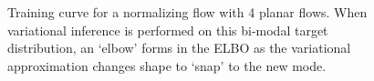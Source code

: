 \lipsum[4]


\setlength\figureheight{5in}
\setlength\figurewidth{5in}

%      

%          
%          
%         

\begin{figure}
    \begin{adjustwidth}{-2cm}{-2cm}
    \centering
     
    \caption{Training curve for a normalizing flow with 4 planar flows. When variational inference is performed on this bi-modal target distribution, an `elbow' forms in the ELBO as the variational approximation changes shape to `snap' to the new mode\cite{blei2017variational}.}
    \label{fig:training_curve_elbow_example}    
    \end{adjustwidth}
\end{figure}

